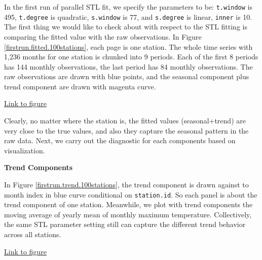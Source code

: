In the first run of parallel STL fit, we specify the parameters to be: 
\texttt{t.window} is 495, \texttt{t.degree} is quadratic, \texttt{s.window} is 
77, and \texttt{s.degree} is linear, \texttt{inner} is 10. The first thing we would 
like to check about with respect to the STL fitting is comparing the fitted value 
with the raw observations. In Figure 
\href{../plots/100stations/first_run/fitted.100stations.tmax.pdf}
{\ref*{firstrun.fitted.100stations}}, each page is one station. The whole time 
series with 1,236 months for one station is chunked into 9 periods. Each of the 
first 8 periods has 144 monthly observations, the last period has 84 monthly 
observations. The raw observations are drawn with blue points, and the seasonal 
component plus trend component are drawn with magenta curve.  

\begin{framed}
\begin{center}
  \href{../plots/100stations/first_run/fitted.100stations.tmax.pdf}{Link to figure}
  \label{firstrun.fitted.100stations}
\end{center}
\end{framed}

Clearly, no matter where the station is, the fitted values (seasonal+trend) are 
very close to the true values, and also they capture the seasonal pattern in the 
raw data. Next, we carry out the diagnostic for each components based on visualization.

\textbf{Trend Components}

In Figure \href{../plots/100stations/first_run/trend.100stations.tmax.pdf}
{\ref*{firstrun.trend.100stations}}, the trend component is drawn against to month
index in blue curve conditional on \texttt{station.id}. So each panel is about 
the trend component of one station. Meanwhile, we plot with trend components 
the moving average of yearly mean of monthly maximum temperature.
Collectively, the same STL parameter setting still can capture the different trend
behavior across all stations.

\begin{framed}
\begin{center}
  \href{../plots/100stations/first_run/trend.100stations.tmax.pdf}{Link to figure}
  \label{firstrun.trend.100stations}
\end{center}
\end{framed}

